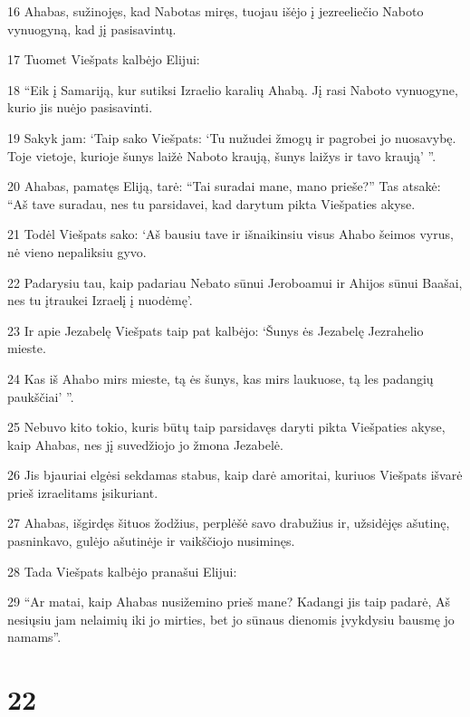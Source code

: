 \par 16 Ahabas, sužinojęs, kad Nabotas miręs, tuojau išėjo į jezreeliečio Naboto vynuogyną, kad jį pasisavintų. 
\par 17 Tuomet Viešpats kalbėjo Elijui: 
\par 18 “Eik į Samariją, kur sutiksi Izraelio karalių Ahabą. Jį rasi Naboto vynuogyne, kurio jis nuėjo pasisavinti. 
\par 19 Sakyk jam: ‘Taip sako Viešpats: ‘Tu nužudei žmogų ir pagrobei jo nuosavybę. Toje vietoje, kurioje šunys laižė Naboto kraują, šunys laižys ir tavo kraują’ ”. 
\par 20 Ahabas, pamatęs Eliją, tarė: “Tai suradai mane, mano prieše?” Tas atsakė: “Aš tave suradau, nes tu parsidavei, kad darytum pikta Viešpaties akyse. 
\par 21 Todėl Viešpats sako: ‘Aš bausiu tave ir išnaikinsiu visus Ahabo šeimos vyrus, nė vieno nepaliksiu gyvo. 
\par 22 Padarysiu tau, kaip padariau Nebato sūnui Jeroboamui ir Ahijos sūnui Baašai, nes tu įtraukei Izraelį į nuodėmę’. 
\par 23 Ir apie Jezabelę Viešpats taip pat kalbėjo: ‘Šunys ės Jezabelę Jezrahelio mieste. 
\par 24 Kas iš Ahabo mirs mieste, tą ės šunys, kas mirs laukuose, tą les padangių paukščiai’ ”. 
\par 25 Nebuvo kito tokio, kuris būtų taip parsidavęs daryti pikta Viešpaties akyse, kaip Ahabas, nes jį suvedžiojo jo žmona Jezabelė. 
\par 26 Jis bjauriai elgėsi sekdamas stabus, kaip darė amoritai, kuriuos Viešpats išvarė prieš izraelitams įsikuriant. 
\par 27 Ahabas, išgirdęs šituos žodžius, perplėšė savo drabužius ir, užsidėjęs ašutinę, pasninkavo, gulėjo ašutinėje ir vaikščiojo nusiminęs. 
\par 28 Tada Viešpats kalbėjo pranašui Elijui: 
\par 29 “Ar matai, kaip Ahabas nusižemino prieš mane? Kadangi jis taip padarė, Aš nesiųsiu jam nelaimių iki jo mirties, bet jo sūnaus dienomis įvykdysiu bausmę jo namams”.



\chapter{22}


